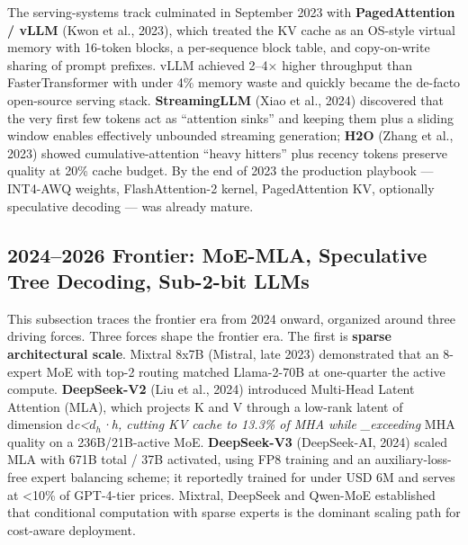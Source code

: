 The serving-systems track culminated in September 2023 with \textbf{PagedAttention / vLLM} (Kwon et al., 2023), which treated the KV cache as an OS-style virtual memory with 16-token blocks, a per-sequence block table, and copy-on-write sharing of prompt prefixes. vLLM achieved 2--4× higher throughput than FasterTransformer with under 4\% memory waste and quickly became the de-facto open-source serving stack. \textbf{StreamingLLM} (Xiao et al., 2024) discovered that the very first few tokens act as ``attention sinks'' and keeping them plus a sliding window enables effectively unbounded streaming generation; \textbf{H2O} (Zhang et al., 2023) showed cumulative-attention ``heavy hitters'' plus recency tokens preserve quality at 20\% cache budget. By the end of 2023 the production playbook --- INT4-AWQ weights, FlashAttention-2 kernel, PagedAttention KV, optionally speculative decoding --- was already mature.

\subsection{2024--2026 Frontier: MoE-MLA, Speculative Tree Decoding, Sub-2-bit LLMs}\label{frontier-moe-mla-speculative-tree-decoding-sub-2-bit-llms}

This subsection traces the frontier era from 2024 onward, organized around three driving forces. Three forces shape the frontier era. The first is \textbf{sparse architectural scale}. Mixtral 8x7B (Mistral, late 2023) demonstrated that an 8-expert MoE with top-2 routing matched Llama-2-70B at one-quarter the active compute. \textbf{DeepSeek-V2} (Liu et al., 2024) introduced Multi-Head Latent Attention (MLA), which projects K and V through a low-rank latent of dimension d\emph{c\textless{}\(d_h\)·h, cutting KV cache to 13.3\% of MHA while \_exceeding} MHA quality on a 236B/21B-active MoE. \textbf{DeepSeek-V3} (DeepSeek-AI, 2024) scaled MLA with 671B total / 37B activated, using FP8 training and an auxiliary-loss-free expert balancing scheme; it reportedly trained for under USD 6M and serves at \textless10\% of GPT-4-tier prices. Mixtral, DeepSeek and Qwen-MoE established that conditional computation with sparse experts is the dominant scaling path for cost-aware deployment.


